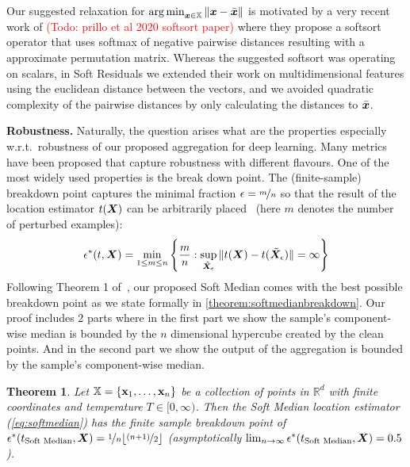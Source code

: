\documentclass[sigconf,authordraft]{acmart}
\newcommand{\features}{\mX}
\newcommand{\featset}{\sX}
\newcommand{\pertm}{\tilde{\mX}_\epsilon}
\newtheorem{theorem}{Theorem}
\newcommand{\todo}[1]{\textcolor{red}{(Todo: #1)}}
\begin{document}
Our suggested relaxation for $\argmin_{\vx \in \featset} \| \vx - \bar{\vx} \|$ is motivated by a very recent work of \todo{prillo et al 2020 softsort paper} where they propose a softsort operator that uses softmax of negative pairwise distances resulting with a approximate permutation matrix. Whereas the suggested softsort was operating on scalars, in Soft Residuals we extended their work on multidimensional features using the euclidean distance between the vectors, and we avoided quadratic complexity of the pairwise distances by only calculating the distances to $\bar{{\bm{x}}}$.

\textbf{Robustness.} Naturally, the question arises what are the properties especially w.r.t.~robustness of our proposed aggregation for deep learning. Many metrics have been proposed that capture robustness with different flavours. One of the most widely used properties is the break down point. The (finite-sample) breakdown point captures the minimal fraction \(\epsilon = \nicefrac{m}{n}\) so that the result of the location estimator \(t(\features)\) can be arbitrarily placed~\citep{Donoho1983} (here \(m\) denotes the number of perturbed examples):
%
\begin{equation}\label{eq:breakdown}
  \epsilon^*(t, \features) = \min_{1 \le m \le n} \left \{ \frac{m}{n}: \sup_{\pertm} \|t(\features)-t(\pertm)\| = \infty \right \}
\end{equation}
%
Following Theorem 1 of~\citet{Geisler2020}, our proposed Soft Median comes with the best possible breakdown point as we state formally in \autoref{theorem:softmedianbreakdown}. Our proof includes 2 parts where in the first part we show the sample's component-wise median is bounded by the $n$ dimensional hypercube created by the clean points. And in the second part we show the output of the aggregation is bounded by the sample's component-wise median.

\begin{theorem}\label{theorem:softmedianbreakdown}
  Let \(\featset = \{ \mathbf{\mathbf{x}}_1, \dots, \mathbf{\mathbf{x}}_n\} \) be a collection of points in \(\mathbb{R}^d\) with finite coordinates and temperature \(T \in [0, \infty) \). Then the Soft Median location estimator (\autoref{eq:softmedian}) has the finite sample breakdown point of \(\epsilon^*(t_{\text{Soft Median}}, \features) = \nicefrac{1}{n} \lfloor \nicefrac{(n+1)}{2}\rfloor \) (asymptotically \( \lim_{n \to \infty} \epsilon^*(t_{\text{Soft Median}}, \features) = 0.5 \)).
\end{theorem}
\end{document}
